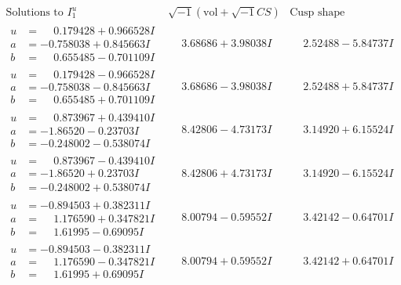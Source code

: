 \documentclass[1p]{elsarticle_modified}
\theoremstyle{definition}
\newcommand{\I}{\sqrt{-1}}
\begin{document}
$$\begin{array}{c|c|c}  
\text{Solutions to }I^u_{1}& \I (\text{vol} + \sqrt{-1}CS) & \text{Cusp shape}\\
 \hline 
\begin{aligned}
u &= \phantom{-}0.179428 + 0.966528 I \\
a &= -0.758038 + 0.845663 I \\
b &= \phantom{-}0.655485 - 0.701109 I\end{aligned}
 & \phantom{-}3.68686 + 3.98038 I & \phantom{-}2.52488 - 5.84737 I \\ \hline\begin{aligned}
u &= \phantom{-}0.179428 - 0.966528 I \\
a &= -0.758038 - 0.845663 I \\
b &= \phantom{-}0.655485 + 0.701109 I\end{aligned}
 & \phantom{-}3.68686 - 3.98038 I & \phantom{-}2.52488 + 5.84737 I \\ \hline\begin{aligned}
u &= \phantom{-}0.873967 + 0.439410 I \\
a &= -1.86520 - 0.23703 I \\
b &= -0.248002 - 0.538074 I\end{aligned}
 & \phantom{-}8.42806 - 4.73173 I & \phantom{-}3.14920 + 6.15524 I \\ \hline\begin{aligned}
u &= \phantom{-}0.873967 - 0.439410 I \\
a &= -1.86520 + 0.23703 I \\
b &= -0.248002 + 0.538074 I\end{aligned}
 & \phantom{-}8.42806 + 4.73173 I & \phantom{-}3.14920 - 6.15524 I \\ \hline\begin{aligned}
u &= -0.894503 + 0.382311 I \\
a &= \phantom{-}1.176590 + 0.347821 I \\
b &= \phantom{-}1.61995 - 0.69095 I\end{aligned}
 & \phantom{-}8.00794 - 0.59552 I & \phantom{-}3.42142 - 0.64701 I \\ \hline\begin{aligned}
u &= -0.894503 - 0.382311 I \\
a &= \phantom{-}1.176590 - 0.347821 I \\
b &= \phantom{-}1.61995 + 0.69095 I\end{aligned}
 & \phantom{-}8.00794 + 0.59552 I & \phantom{-}3.42142 + 0.64701 I \\ \hline\begin{aligned}

\end{aligned}
\end{array}$$
\end{document}
